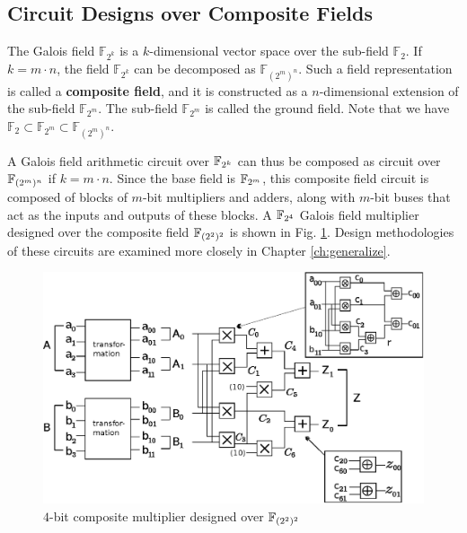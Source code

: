\subsection{Circuit Designs over Composite Fields}
The Galois field $\mathbb{F}_{2^k}$ is a $k$-dimensional vector space over the
sub-field $\mathbb{F}_2$. If $k = m\cdot n$, the field $\mathbb{F}_{2^k}$
can be decomposed as $\mathbb{F}_{(2^m)^n}$. Such a field representation is
called a {\bf composite field}, and it is constructed as a $n$-dimensional 
extension of the sub-field $\mathbb{F}_{2^m}$. The sub-field $\mathbb{F}_{2^m}$ is
called the ground field. Note that we have $\mathbb{F}_2 \subset \mathbb{F}_{2^m}
\subset \mathbb{F}_{(2^m)^n}$.

A Galois field arithmetic circuit over ${\mathbb{F}}_{2^k}$ can thus be composed
as circuit over ${\mathbb{F}}_{(2^m)^n}$ if $k=m\cdot n$.
Since the base field is ${\mathbb{F}}_{2^m}$, this composite field circuit is
composed of blocks of $m$-bit multipliers and adders, along with 
$m$-bit buses that act as the inputs and outputs of these blocks.
A ${\mathbb{F}}_{2^4}$ Galois field multiplier designed over the composite field ${\mathbb{F}}_{(2^2)^2}$ is shown in 
Fig. \ref{fig:comp4exPrelim}.
Design methodologies of these circuits are examined more closely in Chapter \ref{ch:generalize}.

\begin{figure}[t]
        \centering
        \includegraphics[width=.9\linewidth]{./figures/compMineSmall}
        \caption{$4$-bit composite multiplier designed over ${\mathbb{F}}_{(2^2)^2}$}\label{fig:comp4exPrelim}
\end{figure}


